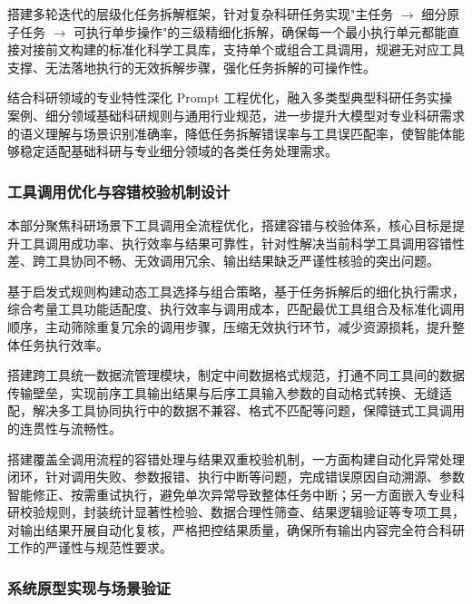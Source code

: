 搭建多轮迭代的层级化任务拆解框架，针对复杂科研任务实现"主任务 $\to$ 细分原子任务 $\to$ 可执行单步操作"的三级精细化拆解，确保每一个最小执行单元都能直接对接前文构建的标准化科学工具库，支持单个或组合工具调用，规避无对应工具支撑、无法落地执行的无效拆解步骤，强化任务拆解的可操作性\cite{yao2023react,shen2023hugginggpt}。

结合科研领域的专业特性深化 Prompt 工程优化\cite{wang2023plansolve}，融入多类型典型科研任务实操案例、细分领域基础科研规则与通用行业规范，进一步提升大模型对专业科研需求的语义理解与场景识别准确率，降低任务拆解错误率与工具误匹配率，使智能体能够稳定适配基础科研与专业细分领域的各类任务处理需求\cite{openai2023gpt4,wang2023plansolve}。

\subsubsection{工具调用优化与容错校验机制设计}

本部分聚焦科研场景下工具调用全流程优化，搭建容错与校验体系，核心目标是提升工具调用成功率、执行效率与结果可靠性，针对性解决当前科学工具调用容错性差、跨工具协同不畅、无效调用冗余、输出结果缺乏严谨性核验的突出问题\cite{schick2023toolformer,qin2023toollearning,shen2023hugginggpt}。

基于启发式规则构建动态工具选择与组合策略，基于任务拆解后的细化执行需求，综合考量工具功能适配度、执行效率与调用成本，匹配最优工具组合及标准化调用顺序，主动筛除重复冗余的调用步骤，压缩无效执行环节，减少资源损耗，提升整体任务执行效率\cite{yao2023react,qin2023toollearning}。

搭建跨工具统一数据流管理模块，制定中间数据格式规范，打通不同工具间的数据传输壁垒，实现前序工具输出结果与后序工具输入参数的自动格式转换、无缝适配，解决多工具协同执行中的数据不兼容、格式不匹配等问题，保障链式工具调用的连贯性与流畅性\cite{shen2023hugginggpt,langchain2023}。

搭建覆盖全调用流程的容错处理与结果双重校验机制，一方面构建自动化异常处理闭环，针对调用失败、参数报错、执行中断等问题，完成错误原因自动溯源、参数智能修正、按需重试执行，避免单次异常导致整体任务中断\cite{schick2023toolformer,qin2023toollearning}；另一方面嵌入专业科研校验规则，封装统计显著性检验、数据合理性筛查、结果逻辑验证等专项工具，对输出结果开展自动化复核，严格把控结果质量，确保所有输出内容完全符合科研工作的严谨性与规范性要求\cite{jumper2021alphafold,butler2018ml4mat}。

\subsubsection{系统原型实现与场景验证}

